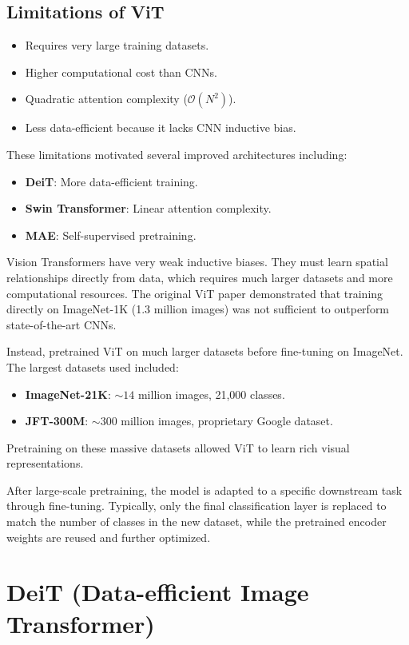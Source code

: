 \subsection{Limitations of ViT}
\begin{itemize}
    \item Requires very large training datasets.
    \item Higher computational cost than CNNs.
    \item Quadratic attention complexity ($\mathcal{O}(N^2)$).
    \item Less data-efficient because it lacks CNN inductive bias.
\end{itemize}

These limitations motivated several improved architectures including:
\begin{itemize}
    \item \textbf{DeiT}: More data-efficient training.
    \item \textbf{Swin Transformer}: Linear attention complexity.
    \item \textbf{MAE}: Self-supervised pretraining.
\end{itemize}

Vision Transformers have very weak inductive biases. They must learn spatial relationships directly from data, which requires much larger datasets and more computational resources. The original ViT paper demonstrated that training directly on ImageNet-1K (1.3 million images) was not sufficient to outperform state-of-the-art CNNs.

Instead, pretrained ViT on much larger datasets before fine-tuning on ImageNet. The largest datasets used included:
\begin{itemize}
    \item \textbf{ImageNet-21K}: $\sim 14$ million images, 21,000 classes.
    \item \textbf{JFT-300M}: $\sim 300$ million images, proprietary Google dataset.
\end{itemize}

Pretraining on these massive datasets allowed ViT to learn rich visual representations.

After large-scale pretraining, the model is adapted to a specific downstream task through fine-tuning. Typically, only the final classification layer is replaced to match the number of classes in the new dataset, while the pretrained encoder weights are reused and further optimized.


\section{DeiT (Data-efficient Image Transformer)}

